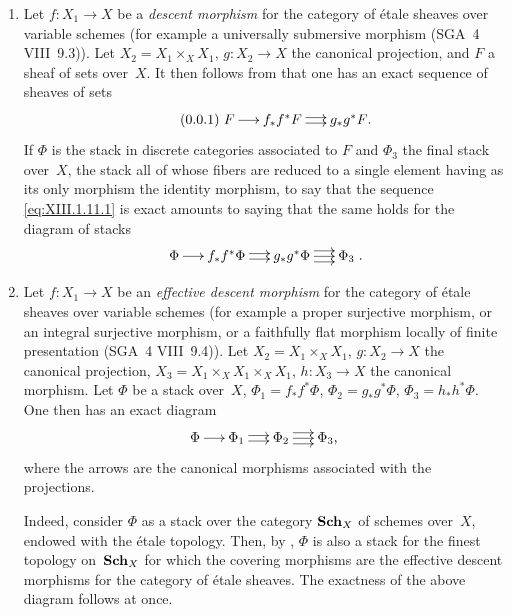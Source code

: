 \begin{examples}
\label{XIII.1.11}
\begin{enumerate}
\item[1)] Let $f \colon X_1 \to X$ be a \emph{descent morphism}
for the category of \'etale sheaves over variable
schemes (for example a universally submersive morphism (SGA~4
VIII~9.3)). Let $X_2 = X_1 \times_X X_1$, $g \colon X_2 \to X$ the
canonical projection, and $F$ a sheaf of sets over~$X$. It then
follows from \loccit that one has an exact sequence of
sheaves of sets
\begin{equation*}
\label{eq:XIII.1.11.1}
\tag{\thesubsection.1} { \xymatrix@C=.5cm{ F \ar[r] & f_* f^* F
\ar@<2pt>[r] \ar@<-2pt>[r] & g_* g^* F \text{.}}
}
\end{equation*}
If $\Phi$ is the stack in discrete categories associated
to $F$ and $\Phi_3$ the final stack over~$X$, \ie the stack all of whose
fibers are reduced to a single element
having as its only morphism the identity morphism, to say that the sequence
\eqref{eq:XIII.1.11.1} is exact amounts to saying that the same
holds for the diagram of stacks
$$
\xymatrix@C=.5cm{ \Phi \ar[r] & f_* f^* \Phi \ar@<2pt>[r]
\ar@<-2pt>[r] & g_* g^* \Phi \ar[r] \ar@<4pt>[r]
\ar@<-4pt>[r] & \Phi_3 } \text{.}
$$

\item[2)]
Let
$f \colon X_1 \to X$ be an \emph{effective descent morphism}
for the category of \'etale sheaves over variable
schemes (for example a proper surjective morphism, or an integral
surjective morphism, or a faithfully flat morphism locally of
finite presentation (SGA~4 VIII~9.4)). Let $X_2 = X_1 \times_X
X_1$, $g \colon X_2 \to X$ the canonical projection, $X_3 = X_1
\times_X X_1 \times_X X_1$, $h \colon X_3 \to X$ the canonical
morphism. Let $\Phi$ be a stack over~$X$, $\Phi_1 = f_* f^* \Phi$,
$\Phi_2 = g_* g^* \Phi$, $\Phi_3 = h_* h^* \Phi$. One then has an
exact diagram
$$
\xymatrix@C=.5cm{ \Phi \ar[r] & \Phi_1 \ar@<2pt>[r] \ar@<-2pt>[r] &
\Phi_2 \ar[r] \ar@<4pt>[r] \ar@<-4pt>[r] & \Phi_3 \text{,} }
$$
where the arrows are the canonical morphisms associated with the
projections.

Indeed, consider $\Phi$ as a stack over the category
$\mathbf{Sch}_X$ of schemes over~$X$, endowed with the \'etale
topology. Then, by \cite[VII 2.2.8]{XIII.2}, $\Phi$ is also a
stack for the finest topology on~$\mathbf{Sch}_X$ for which the
covering morphisms are the effective descent morphisms for the
category of \'etale sheaves. The exactness of the above diagram
follows at once.
\end{enumerate}
\end{examples}

